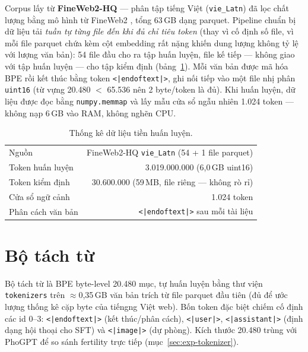 Corpus lấy từ \textbf{FineWeb2-HQ} \autocite{messmer2025fineweb2hq} --- phân
tập tiếng Việt (\texttt{vie\_Latn}) đã lọc chất lượng bằng mô hình từ FineWeb2
\autocite{penedo2024fineweb}, tổng 63\,GB dạng parquet. Pipeline chuẩn bị dữ
liệu tải \emph{tuần tự từng file đến khi đủ chỉ tiêu token} (thay vì cố định
số file, vì mỗi file parquet chứa kèm cột embedding rất nặng khiến dung lượng
không tỷ lệ với lượng văn bản): 54 file đầu cho ra tập huấn luyện, file kế
tiếp --- không giao với tập huấn luyện --- cho tập kiểm định
(bảng~\ref{tab:pretrain-data}). Mỗi văn bản được mã hóa BPE rồi kết thúc bằng
token \texttt{<|endoftext|>}, ghi nối tiếp vào một file nhị phân
\texttt{uint16} (từ vựng 20.480 $<$ 65.536 nên 2 byte/token là đủ). Khi huấn
luyện, dữ liệu được đọc bằng \texttt{numpy.memmap} và lấy mẫu cửa sổ ngẫu
nhiên 1.024 token --- không nạp 6\,GB vào RAM, không nghẽn CPU.

\begin{table}[H]
	\centering
	\caption{Thống kê dữ liệu tiền huấn luyện.}
	\label{tab:pretrain-data}
	\begin{tabular}{lr}
		\hline
		Nguồn & FineWeb2-HQ \texttt{vie\_Latn} (54 + 1 file parquet) \\
		Token huấn luyện & 3.019.000.000 (6,0\,GB uint16) \\
		Token kiểm định & 30.600.000 (59\,MB, file riêng --- không rò rỉ) \\
		Cửa sổ ngữ cảnh & 1.024 token \\
		Phân cách văn bản & \texttt{<|endoftext|>} sau mỗi tài liệu \\
		\hline
	\end{tabular}
\end{table}

\section{Bộ tách từ}
\label{sec:met-tokenizer}

Bộ tách từ là BPE byte-level 20.480 mục, tự huấn luyện bằng thư viện
\texttt{tokenizers} trên $\approx$0,35\,GB văn bản trích từ file parquet đầu
tiên (đủ để ước lượng thống kê cặp byte của tiếngng Việt web). Bốn token đặc
biệt chiếm cố định các id 0--3: \texttt{<|endoftext|>} (kết thúc/phân cách),
\texttt{<|user|>}, \texttt{<|assistant|>} (định dạng hội thoại cho SFT) và
\texttt{<|image|>} (dự phòng). Kích thước 20.480 trùng với PhoGPT
\autocite{nguyen2023phogpt} để so sánh fertility trực tiếp
(mục~\ref{sec:exp-tokenizer}).

